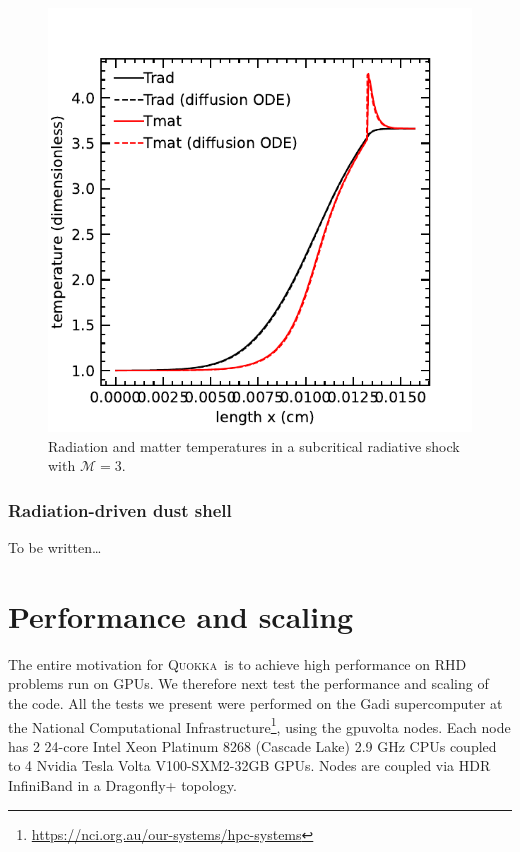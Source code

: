 \documentclass[fleqn,usenatbib]{mnras}
\newcommand{\quokka}{\textsc{Quokka}}
\begin{document}
\begin{figure}
    \includegraphics[width=\columnwidth]{radshock_cgs_temperature.pdf}
    \caption{Radiation and matter temperatures in a subcritical radiative shock with $\mathcal{M} = 3$.}
    \label{fig:radshock}
\end{figure}

\subsubsection{Radiation-driven dust shell}
\label{section:shell}
To be written\dots

\section{Performance and scaling}
The entire motivation for \quokka~is to achieve high performance on RHD problems run on GPUs. We therefore next test the performance and scaling of the code. All the tests we present were performed on the Gadi supercomputer at the National Computational Infrastructure\footnote{\url{https://nci.org.au/our-systems/hpc-systems}}, using the gpuvolta nodes. Each node has 2 24-core Intel Xeon Platinum 8268 (Cascade Lake) 2.9 GHz CPUs coupled to 4 Nvidia Tesla Volta V100-SXM2-32GB GPUs. Nodes are coupled via HDR InfiniBand in a Dragonfly+ topology.
\end{document}
